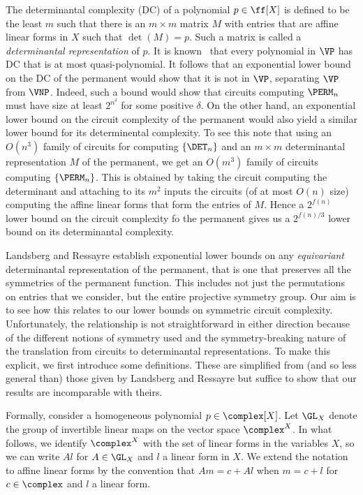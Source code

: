 \documentclass{toc}
\begin{document}
The determinantal complexity (DC) of a polynomial $p \in \ff[X]$ is defined to be the least $m$ such that there is an $m\times m$ matrix $M$ with entries that are affine linear forms in $X$ such that $\det(M) = p$.  Such a matrix is called a \emph{determinantal representation} of $p$.  It is known~\cite{Valiant79} that every polynomial in $\VP$ has DC that is at most quasi-polynomial.  It follows that an exponential lower bound on the DC of the permanent would show that it is not in $\VP$, separating $\VP$ from $\VNP$.  Indeed, such a bound would 
show that circuits computing $\PERM_n$ must have size at least $2^{n^{\delta}}$ for some positive $\delta$.  On the other hand, an exponential lower bound on the circuit complexity of the permanent would also yield a similar lower bound for its determinental complexity.  To see this note that using an $O(n^3)$ family of circuits for computing $\{\DET_n\}$ and an $m\times m$ determinantal representation $M$ of the permanent, we get an $O(m^3)$ family of circuits computing $\{\PERM_n\}$.  This is obtained by taking the circuit computing the determinant and attaching to its $m^2$ inputs the circuits (of at most $O(n)$ size) computing the affine linear forms that form the entries of $M$.  Hence a $2^{f(n)}$ lower bound on the circuit complexity fo the permanent gives us a $2^{f(n)/3}$ lower bound on its determinantal complexity.

Landsberg and Ressayre establish exponential lower bounds on any \emph{equivariant} determinantal representation of the permanent, that is one that preserves all the symmetries of the permanent function.  This includes not just the
permutations on entries that we consider, but the entire projective symmetry
group.  Our aim is to see how this relates to our lower bounds on symmetric circuit complexity.  Unfortunately, the relationship is not straightforward in either direction because of the different notions of symmetry used and the symmetry-breaking nature of the translation from circuits to determinantal representations.  To make this explicit, we first introduce some definitions.  These are simplified from (and so less general than) those given by Landsberg and Ressayre but suffice to show that our results are incomparable with theirs. 

Formally, consider a homogeneous polynomial $p \in \complex[X]$.  Let
$\GL_X$ denote the group of invertible linear maps on the vector space
$\complex^X$.  In what follows, we identify $\complex^X$ with the set
of linear forms in the variables $X$, so we can write $Al$ for
$A \in \GL_X$ and $l$ a linear form in $X$.  We extend the notation to
affine linear forms %
%
by the convention that $Am = c + Al$ when $m = c+
l$ for $c \in \complex$ and $l$ a linear form.
\end{document}
